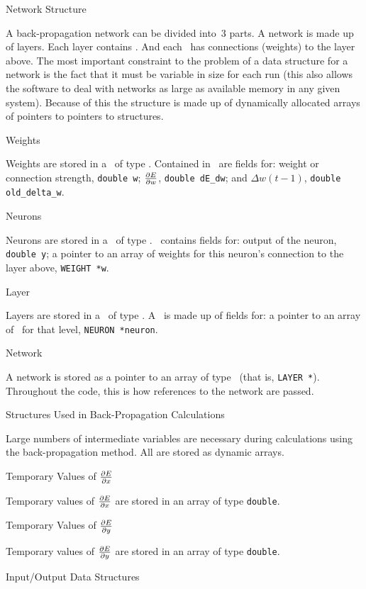 \ssec Network Structure

A back-propagation network can be divided into~$3$ parts.
A network is made up of layers.
Each layer contains \neus.
And each \neu\ has connections (weights) to the layer above.
The most important constraint to the problem of a data structure for
a network is the fact that it must be variable in size for each run
(this also allows the software to deal with networks as large as
available memory in any given system).
Because of this the structure is made up of dynamically allocated
arrays of pointers to pointers to structures.

\sssec Weights

Weights are stored in a \struct\ of type \WEIGHT.
Contained in \WEIGHT\ are fields for: weight or connection
strength, {\tt double w}; $\partial E \over \partial w$, {\tt double
dE\_dw}; and $\Delta w(t-1)$, {\tt double old\_delta\_w}.

\sssec Neurons

Neurons are stored in a \struct\ of type \NEURON.
\NEURON\ contains fields for: output of the neuron, {\tt double
y}; a pointer to an array of weights for this neuron's connection 
to the layer above, {\tt WEIGHT *w}.

\sssec Layer

Layers are stored in a \struct\ of type \LAYER.
A \LAYER\ is made up of fields for: a pointer to an array of \neus\
for that level, {\tt NEURON *neuron}.

\sssec Network

A network is stored as a pointer to an array of type \LAYER\ (that
is, {\tt LAYER *}).
Throughout the code, this is how references to the network are
passed.

\ssec Structures Used in Back-Propagation Calculations

Large numbers of intermediate variables are necessary during
calculations using the back-propagation method.
All are stored as dynamic arrays.

\sssec Temporary Values of $\partial E \over \partial x$

Temporary values of $\partial E \over \partial x$ are stored in an
array of type {\tt double}.

\sssec Temporary Values of $\partial E \over \partial y$

Temporary values of $\partial E \over \partial y$ are stored in an
array of type {\tt double}.

\ssec Input/Output Data Structures

